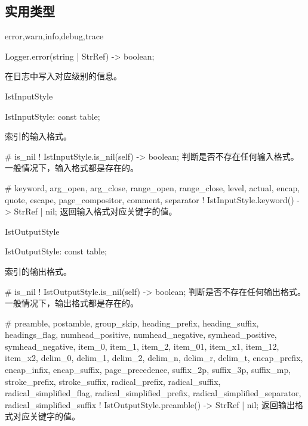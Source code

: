 \documentclass[class=article,doc={kv-usage}]{cusdoc}
\begin{document}
\subsection{实用类型}

\begin{luadoc}[path=Logger]{error,warn,info,debug,trace}
  \begin{luasyntax}
    Logger.error(string | StrRef) -> boolean;
  \end{luasyntax}
在日志中写入对应级别的信息。
\end{luadoc}

\begin{luadoc}[global]{IstInputStyle}
  \begin{luasyntax}
    IstInputStyle: const table;
  \end{luasyntax}
索引的输入格式。
\end{luadoc}

\begin{luadoc*}{}
# is_nil
! IstInputStyle.is_nil(self) -> boolean;
判断是否不存在任何输入格式。一般情况下，输入格式都是存在的。
\end{luadoc*}

\begin{luadoc*}{}
# keyword, arg_open, arg_close, range_open, range_close, level, actual, encap, quote, escape, page_compositor, comment, separator
! IstInputStyle.keyword() -> StrRef | nil;
返回输入格式对应关键字的值。
\end{luadoc*}

\begin{luadoc}[global]{IstOutputStyle}
  \begin{luasyntax}
    IstOutputStyle: const table;
  \end{luasyntax}
索引的输出格式。
\end{luadoc}

\begin{luadoc*}{}
# is_nil
! IstOutputStyle.is_nil(self) -> boolean;
判断是否不存在任何输出格式。一般情况下，输出格式都是存在的。
\end{luadoc*}

\begin{luadoc*}{}
# preamble, postamble, group_skip, heading_prefix, heading_suffix, headings_flag, numhead_positive, numhead_negative, symhead_positive, symhead_negative, item_0, item_1, item_2, item_01, item_x1, item_12, item_x2, delim_0, delim_1, delim_2, delim_n, delim_r, delim_t, encap_prefix, encap_infix, encap_suffix, page_precedence, suffix_2p, suffix_3p, suffix_mp, stroke_prefix, stroke_suffix, radical_prefix, radical_suffix, radical_simplified_flag, radical_simplified_prefix, radical_simplified_separator, radical_simplified_suffix
! IstOutputStyle.preamble() -> StrRef | nil;
返回输出格式对应关键字的值。
\end{luadoc*}
\end{document}
